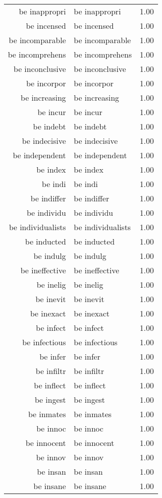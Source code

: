 \begin{table}[ht]
\begin{tabular}{rlr}
  be inappropri & be inappropri & 1.00 \\ 
  be incensed & be incensed & 1.00 \\ 
  be incomparable & be incomparable & 1.00 \\ 
  be incomprehens & be incomprehens & 1.00 \\ 
  be inconclusive & be inconclusive & 1.00 \\ 
  be incorpor & be incorpor & 1.00 \\ 
  be increasing & be increasing & 1.00 \\ 
  be incur & be incur & 1.00 \\ 
  be indebt & be indebt & 1.00 \\ 
  be indecisive & be indecisive & 1.00 \\ 
  be independent & be independent & 1.00 \\ 
  be index & be index & 1.00 \\ 
  be indi & be indi & 1.00 \\ 
  be indiffer & be indiffer & 1.00 \\ 
  be individu & be individu & 1.00 \\ 
  be individualists & be individualists & 1.00 \\ 
  be inducted & be inducted & 1.00 \\ 
  be indulg & be indulg & 1.00 \\ 
  be ineffective & be ineffective & 1.00 \\ 
  be inelig & be inelig & 1.00 \\ 
  be inevit & be inevit & 1.00 \\ 
  be inexact & be inexact & 1.00 \\ 
  be infect & be infect & 1.00 \\ 
  be infectious & be infectious & 1.00 \\ 
  be infer & be infer & 1.00 \\ 
  be infiltr & be infiltr & 1.00 \\ 
  be inflect & be inflect & 1.00 \\ 
  be ingest & be ingest & 1.00 \\ 
  be inmates & be inmates & 1.00 \\ 
  be innoc & be innoc & 1.00 \\ 
  be innocent & be innocent & 1.00 \\ 
  be innov & be innov & 1.00 \\ 
  be insan & be insan & 1.00 \\ 
  be insane & be insane & 1.00 \\ 

\end{tabular}
\end{table}
